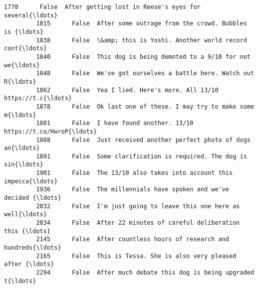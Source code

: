 \documentclass[11pt]{article}
\begin{document}
\begin{Verbatim}[commandchars=\\\{\}]
         1770      False  After getting lost in Reese's eyes for several{\ldots}   
         1815      False  After some outrage from the crowd. Bubbles is {\ldots}   
         1838      False  \&amp; this is Yoshi. Another world record cont{\ldots}   
         1840      False  This dog is being demoted to a 9/10 for not we{\ldots}   
         1848      False  We've got ourselves a battle here. Watch out R{\ldots}   
         1862      False  Yea I lied. Here's more. All 13/10 https://t.c{\ldots}   
         1878      False  Ok last one of these. I may try to make some m{\ldots}   
         1881      False  I have found another. 13/10 https://t.co/HwroP{\ldots}   
         1888      False  Just received another perfect photo of dogs an{\ldots}   
         1891      False  Some clarification is required. The dog is sin{\ldots}   
         1901      False  The 13/10 also takes into account this impecca{\ldots}   
         1936      False  The millennials have spoken and we've decided {\ldots}   
         2032      False  I'm just going to leave this one here as well{\ldots}   
         2034      False  After 22 minutes of careful deliberation this {\ldots}   
         2145      False  After countless hours of research and hundreds{\ldots}   
         2165      False  This is Tessa. She is also very pleased after {\ldots}   
         2294      False  After much debate this dog is being upgraded t{\ldots}   
         

\end{Verbatim}
\end{document}
